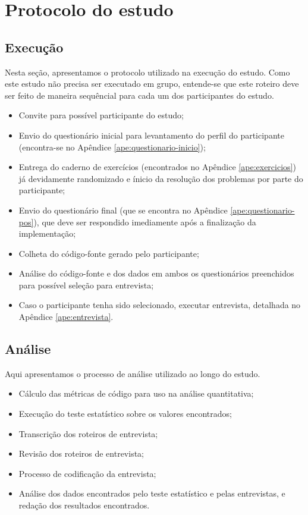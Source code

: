 \chapter{Protocolo do estudo}
\label{ape:protocolo-resumido}

\section{Execução}

Nesta seção, apresentamos o protocolo utilizado na execução do estudo.
Como este estudo não precisa ser executado em grupo, entende-se que este
roteiro deve ser feito de maneira sequêncial para cada um dos participantes
do estudo.
 
\begin{itemize}
  
  \item Convite para possível participante do estudo;
  \item Envio do questionário inicial para levantamento do perfil do
  participante (encontra-se no Apêndice \ref{ape:questionario-inicio});
  \item Entrega do caderno de exercícios (encontrados no Apêndice
  \ref{ape:exercicios}) já devidamente randomizado e ínicio da resolução dos problemas por parte do participante;
  \item Envio do questionário final (que se encontra no Apêndice
  \ref{ape:questionario-pos}), que deve ser respondido imediamente após a
  finalização da implementação;
  \item Colheta do código-fonte gerado pelo participante;
  \item Análise do código-fonte e dos dados em ambos os questionários
  preenchidos para possível seleção para entrevista;
  \item Caso o participante tenha sido selecionado, executar entrevista,
  detalhada no Apêndice \ref{ape:entrevista}.

\end{itemize}

\section{Análise}

Aqui apresentamos o processo de análise utilizado ao longo do estudo.

\begin{itemize}
  \item Cálculo das métricas de código para uso na análise quantitativa;
  \item Execução do teste estatístico sobre os valores encontrados;
  \item Transcrição dos roteiros de entrevista;
  \item Revisão dos roteiros de entrevista;
  \item Processo de codificação da entrevista;
  \item Análise dos dados encontrados pelo teste estatístico e pelas
  entrevistas, e redação dos resultados encontrados.
\end{itemize}
